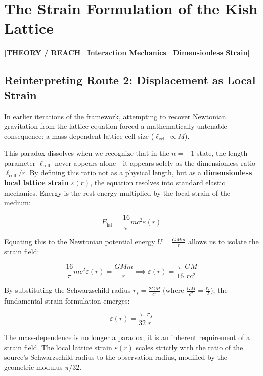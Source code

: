 \documentclass[11pt, letterpaper, openany]{book}
\begin{document}
\chapter{The Strain Formulation of the Kish Lattice}

\begin{center}
{\color{theorytag}\textbf{[THEORY / REACH \textbullet\ Interaction Mechanics \textbullet\ Dimensionless Strain]}}
\end{center}

\section{Reinterpreting Route 2: Displacement as Local Strain}

In earlier iterations of the framework, attempting to recover Newtonian gravitation from the lattice equation forced a mathematically untenable consequence: a mass-dependent lattice cell size ($\ell_{\text{cell}} \propto M$). 

This paradox dissolves when we recognize that in the $n=-1$ state, the length parameter $\ell_{\text{cell}}$ never appears alone—it appears solely as the dimensionless ratio $\ell_{\text{cell}}/r$. By defining this ratio not as a physical length, but as a \textbf{dimensionless local lattice strain $\varepsilon(r)$}, the equation resolves into standard elastic mechanics. Energy is the rest energy multiplied by the local strain of the medium:

\[
E_{\text{lat}} = \frac{16}{\pi} m c^2 \varepsilon(r)
\]

Equating this to the Newtonian potential energy $U = \frac{GMm}{r}$ allows us to isolate the strain field:

\[
\frac{16}{\pi} m c^2 \varepsilon(r) = \frac{GMm}{r} \implies \varepsilon(r) = \frac{\pi}{16} \frac{GM}{r c^2}
\]

By substituting the Schwarzschild radius $r_s = \frac{2GM}{c^2}$ (where $\frac{GM}{c^2} = \frac{r_s}{2}$), the fundamental strain formulation emerges:

\[
\varepsilon(r) = \frac{\pi}{32} \frac{r_s}{r}
\]

The mass-dependence is no longer a paradox; it is an inherent requirement of a strain field. The local lattice strain $\varepsilon(r)$ scales strictly with the ratio of the source's Schwarzschild radius to the observation radius, modified by the geometric modulus $\pi/32$.
\end{document}
